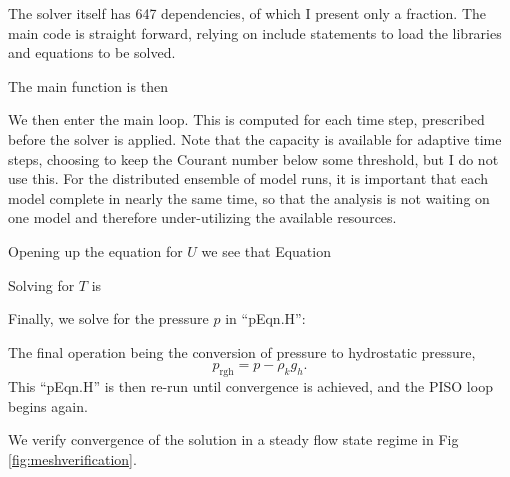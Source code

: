 \documentclass[pre,twocolumn,twoside,byrevtex,superscriptaddress]{revtex4}
\begin{document}
The solver itself has 647 dependencies, of which I present only a fraction.
The main code is straight forward, relying on include statements to load the libraries and equations to be solved.



The main function is then



We then enter the main loop.
This is computed for each time step, prescribed before the solver is applied.
Note that the capacity is available for adaptive time steps, choosing to keep the Courant number below some threshold, but I do not use this.
For the distributed ensemble of model runs, it is important that each model complete in nearly the same time, so that the analysis is not waiting on one model and therefore under-utilizing the available resources.



Opening up the equation for $U$ we see that Equation



Solving for $T$ is 



Finally, we solve for the pressure $p$ in ``pEqn.H'':



The final operation being the conversion of pressure to hydrostatic pressure,
\begin{equation*} p _\text{rgh} = p - \rho _k g_h . \end{equation*}
This ``pEqn.H'' is then re-run until convergence is achieved, and the PISO loop begins again.

We verify convergence of the solution in a steady flow state regime in Fig \ref{fig:meshverification}.
\end{document}
